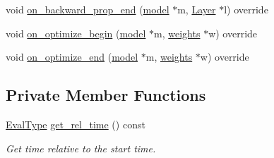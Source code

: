 \begin{DoxyCompactItemize}
\item 
void \hyperlink{classlbann_1_1lbann__callback__timeline_a0de42325a96128f7e41ecf8004b99b26}{on\+\_\+backward\+\_\+prop\+\_\+end} (\hyperlink{classlbann_1_1model}{model} $\ast$m, \hyperlink{classlbann_1_1Layer}{Layer} $\ast$l) override
\item 
void \hyperlink{classlbann_1_1lbann__callback__timeline_a2037300798c70d831845c7efaf5de6c2}{on\+\_\+optimize\+\_\+begin} (\hyperlink{classlbann_1_1model}{model} $\ast$m, \hyperlink{classlbann_1_1weights}{weights} $\ast$w) override
\item 
void \hyperlink{classlbann_1_1lbann__callback__timeline_afdf506e2c2d40c7b0d1f845fb0ed077e}{on\+\_\+optimize\+\_\+end} (\hyperlink{classlbann_1_1model}{model} $\ast$m, \hyperlink{classlbann_1_1weights}{weights} $\ast$w) override
\end{DoxyCompactItemize}
\subsection*{Private Member Functions}
\begin{DoxyCompactItemize}
\item 
\hyperlink{base_8hpp_a3266f5ac18504bbadea983c109566867}{Eval\+Type} \hyperlink{classlbann_1_1lbann__callback__timeline_a67da1376356bf2153ab67489014e0ad4}{get\+\_\+rel\+\_\+time} () const
\begin{DoxyCompactList}\small\item\em Get time relative to the start time. \end{DoxyCompactList}\end{DoxyCompactItemize}
